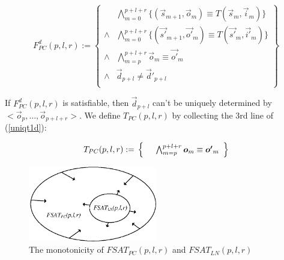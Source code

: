 \documentclass[runningheads,a4paper,orivec]{llncs}
\begin{document}
\begin{equation}\label{uniqt1d}
F^d_{PC}(p,l,r):=
\left\{
\begin{array}{cc}
&\bigwedge_{m=0}^{p+l+r}
\{
(\vec{s}_{m+1},\vec{o}_m)\equiv T(\vec{s}_m,\vec{i}_m)
\}
\\
\wedge&\bigwedge_{m=0}^{p+l+r}
\{
(\vec{s'}_{m+1},\vec{o'}_m)\equiv T(\vec{s'}_m,\vec{i'}_m)
\}
\\
\wedge&\bigwedge_{m=p}^{p+l+r}\vec{o}_m\equiv \vec{o'}_m \\
\wedge& \vec{d}_{p+l}\ne \vec{d}'_{p+l} \\
\end{array}
\right\}
\end{equation}

If $F^d_{PC}(p,l,r)$ is satisfiable,
then $\vec{d}_{p+l}$ can't be uniquely determined by $<\vec{o}_p,\dots,\vec{o}_{p+l+r}>$.
We define $T_{PC}(p,l,r)$ by collecting the 3rd line of (\ref{uniqt1d}):

\begin{equation}\label{tpc}
T_{PC}(p,l,r):=\\
\left\{
\begin{array}{cc}
      &\bigwedge_{m=p}^{p+l+r}\vec{o}_m\equiv \vec{o'}_m \\
\end{array}
\right\}
\end{equation}

\begin{figure}[b]
\begin{center}
\includegraphics[width=0.5\textwidth]{mono}
\end{center}
\caption{The monotonicity of $FSAT_{PC}(p,l,r)$ and $FSAT_{LN}(p,l,r)$}
  \label{fig_mono}
\end{figure}
\end{document}
